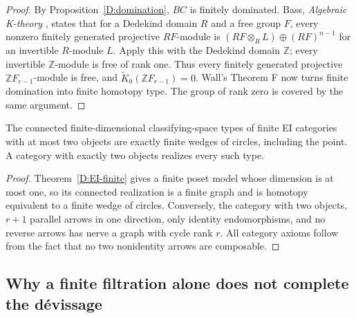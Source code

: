 \begin{proof}
By Proposition~\ref{D:domination}, $BC$ is finitely dominated.  Bass,
\emph{Algebraic K-theory} \cite[Chapter IV, Corollary 6.4, p.~213]{bass1968D},
states that for a Dedekind domain $R$ and a free group $F$, every
nonzero finitely generated projective $RF$-module is
$(RF\otimes_R L)\oplus(RF)^{n-1}$ for an invertible $R$-module $L$.
Apply this with the Dedekind domain $\mathbb Z$; every invertible
$\mathbb Z$-module is free of rank one.  Thus every finitely generated
projective $\mathbb ZF_{r-1}$-module is free, and
$\widetilde K_0(\mathbb ZF_{r-1})=0$.
Wall's Theorem F \cite{wall1965D} now turns finite domination into finite homotopy
type.  The group of rank zero is covered by the same argument.
\end{proof}

\begin{corollary}
\label{D:two-EI-types}
The connected finite-dimensional classifying-space types of finite
EI categories with at most two objects are exactly finite wedges of
circles, including the point.  A category with exactly two objects
realizes every such type.
\end{corollary}
\begin{proof}
Theorem~\ref{D:EI-finite} gives a finite poset model whose dimension
is at most one, so its connected realization is a finite graph and
is homotopy equivalent to a finite wedge of circles.  Conversely,
the category with two objects, $r+1$ parallel arrows in one direction,
only identity endomorphisms, and no reverse arrows has nerve a graph
with cycle rank $r$.  All category axioms follow from the fact that
no two nonidentity arrows are composable.
\end{proof}

\subsection{Why a finite filtration alone does not complete the d\'evissage}

